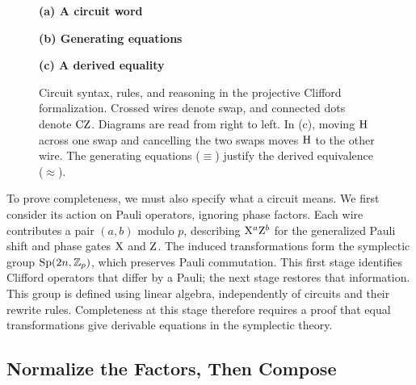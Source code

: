 \documentclass[acmsmall,screen,nonacm]{acmart}
\begin{document}
\begin{figure}[!htbp]
\centering
\begin{minipage}[t]{0.39\linewidth}\centering\vspace{0pt}
\textbf{(a) A circuit word}\par\smallskip
{}
\end{minipage}\hfill
\begin{minipage}[t]{0.57\linewidth}\centering\vspace{0pt}
\textbf{(b) Generating equations}\par\smallskip
{}
\end{minipage}
\par\medskip
\textbf{(c) A derived equality}\par\smallskip
{}
\caption{Circuit syntax, rules, and reasoning in the projective Clifford formalization. Crossed wires denote swap, and connected dots denote $\mathrm{CZ}$. Diagrams are read from right to left. In (c), moving $\mathrm{H}$ across one swap and cancelling the two swaps moves $\mathrm{H}$ to the other wire. The generating equations ($\equiv$) justify the derived equivalence ($\approx$).}
\label{fig:q-rewriting}
\end{figure}

To prove completeness, we must also specify what a circuit means. We first consider its action on Pauli operators, ignoring phase factors. Each wire contributes a pair $(a,b)$ modulo $p$, describing $\mathrm{X}^a\mathrm{Z}^b$ for the generalized Pauli shift and phase gates $\mathrm{X}$ and $\mathrm{Z}$. The induced transformations form the symplectic group $\mathrm{Sp}(2n,\mathbb{Z}_p)$, which preserves Pauli commutation. This first stage identifies Clifford operators that differ by a Pauli; the next stage restores that information. This group is defined using linear algebra, independently of circuits and their rewrite rules. Completeness at this stage therefore requires a proof that equal transformations give derivable equations in the symplectic theory.

\subsection{Normalize the Factors, Then Compose}\label{sec:q-symplectic}\label{sec:q-composing}
\end{document}
